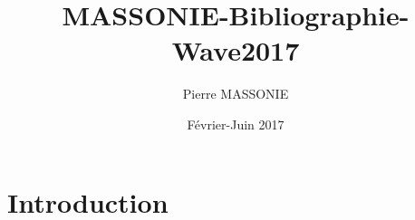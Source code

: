 \documentclass{article}
\title{MASSONIE-Bibliographie-Wave2017}
\author{Pierre MASSONIE}
\date{Février-Juin 2017}
\begin{document}
\maketitle

\section{Introduction}
\end{document}
